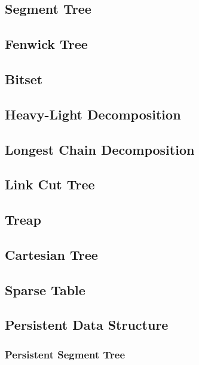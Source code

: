 \documentclass[10pt,a4paper]{article}
\newcommand{\codedir}{../code/}
\newcommand{\code}[2][]{%
}
\begin{document}
\begin{multicols}{2}
\subsection{Segment Tree}
\code{SegmentTree.cpp}

\subsection{Fenwick Tree}
\code{FenwickTree.cpp}

\subsection{Bitset}
\code{Bitset.cpp}

\subsection{Heavy-Light Decomposition}
\code{HLD.cpp}

\subsection{Longest Chain Decomposition}
\code{LCD.cpp}

\subsection{Link Cut Tree}
\code{LCT.cpp}

\subsection{Treap}
\code{Treap.cpp}

\subsection{Cartesian Tree}
\code{Cartesian.cpp}

\subsection{Sparse Table}
\code{ST.cpp}

\subsection{Persistent Data Structure}

\subsubsection{Persistent Segment Tree}
\code{Persistent_SegmentTree.cpp}


\end{multicols}
\end{document}
